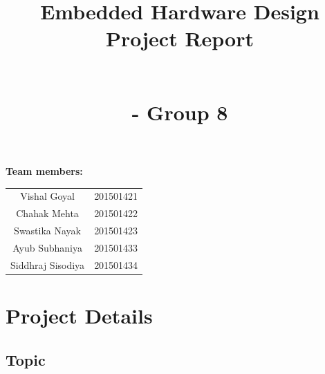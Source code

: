 \documentclass[a4paper,12pt]{article}
\title{\vspace{4cm} Embedded Hardware Design \\ Project Report \\ \\\begin{flushright} \small{- Group 8} \end{flushright}\hline}
\date{}
\begin{document}
\begin{titlepage}
    
    \maketitle
    
    \vspace{5cm}
    \textbf{Team members:}
        \begin{table}[h!]
            \begin{tabular}{c c}
         Vishal Goyal & 201501421 \\
         Chahak Mehta & 201501422\\
         Swastika Nayak & 201501423\\
         Ayub Subhaniya & 201501433\\
         Siddhraj Sisodiya & 201501434
            \end{tabular}
        \end{table}
\end{titlepage}

\section{Project Details}

\subsection{Topic}
\end{document}
